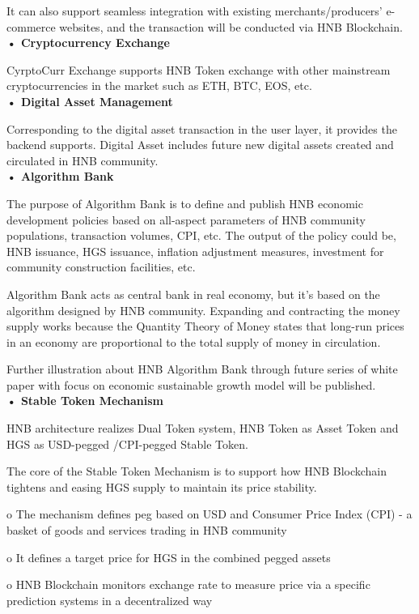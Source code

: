 \documentclass[fleqn,10pt]{SelfArx} %
\begin{document}
It can also support seamless integration with existing merchants/producers’ e-commerce websites, and the transaction will be conducted via HNB Blockchain. \\

\textbf {•	Cryptocurrency Exchange}

CyrptoCurr Exchange supports HNB Token exchange with other mainstream cryptocurrencies in the market such as ETH, BTC, EOS, etc. \\

\textbf {•	Digital Asset Management}

Corresponding to the digital asset transaction in the user layer, it provides the backend supports. Digital Asset includes future new digital assets created and circulated in HNB community. \\

\textbf {•	Algorithm Bank}

The purpose of Algorithm Bank is to define and publish HNB economic development policies based on all-aspect parameters of HNB community populations, transaction volumes, CPI, etc. The output of the policy could be, HNB issuance, HGS issuance, inflation adjustment measures, investment for community construction facilities, etc.

Algorithm Bank acts as central bank in real economy, but it’s based on the algorithm designed by HNB community. Expanding and contracting the money supply works because the Quantity Theory of Money states that long-run prices in an economy are proportional to the total supply of money in circulation.

Further illustration about HNB Algorithm Bank through future series of white paper with focus on economic sustainable growth model will be published. \\
 
\textbf {•	Stable Token Mechanism}

HNB architecture realizes Dual Token system, HNB Token as Asset Token and HGS as USD-pegged /CPI-pegged Stable Token.

The core of the Stable Token Mechanism is to support how HNB Blockchain tightens and easing HGS supply to maintain its price stability. 

o	The mechanism defines peg based on USD and Consumer Price Index (CPI) - a basket of goods and services trading in HNB community

o	It defines a target price for HGS in the combined pegged assets

o	HNB Blockchain monitors exchange rate to measure price via a specific prediction systems in a decentralized way
\end{document}
